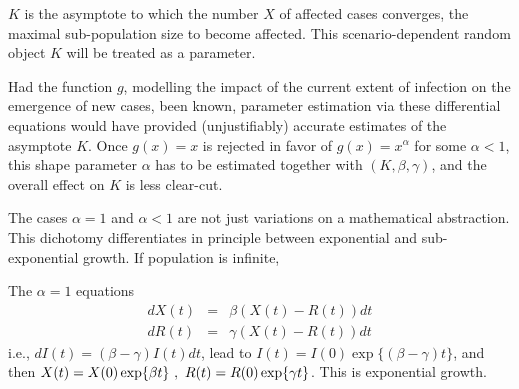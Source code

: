 \documentclass{article}
\begin{document}
$K$ is the asymptote to which the number $X$ of affected cases converges, the maximal sub-population size to become affected. This scenario-dependent random object $K$ will be treated as a parameter.

Had the function $g$, modelling the impact of the current extent of infection on the emergence of new cases, been known, parameter estimation via these differential equations would have provided (unjustifiably) accurate estimates of the asymptote $K$. Once $g(x)=x$ is rejected in favor of \linebreak $g(x)=x^\alpha$ for some $\alpha<1$, this shape parameter $\alpha$ has to be estimated together with $(K , \beta, \gamma)$, and the overall effect on $K$ is less clear-cut.


\bigskip

 The cases $\alpha=1$ and $\alpha<1$ are not just variations on a mathematical abstraction. This dichotomy differentiates in principle between exponential and sub-exponential growth. If population is infinite,

The $\alpha=1$ equations
\begin{eqnarray}
d X(t) & = & \beta (X(t)-R(t)) dt \label{DEforX1} \\
d R(t) & = & \gamma (X(t)-R(t)) dt \label{DEforR1}
\end{eqnarray}
i.e., $d I(t) = (\beta-\gamma) I(t) dt$, lead to $I(t)=I(0)\exp\{(\beta-\gamma)t\}$, and then $X(t)=X(0)\exp\{\beta t\} \ , \ \linebreak R(t)=R(0)\exp\{\gamma t\}$. This is exponential growth.
\end{document}
